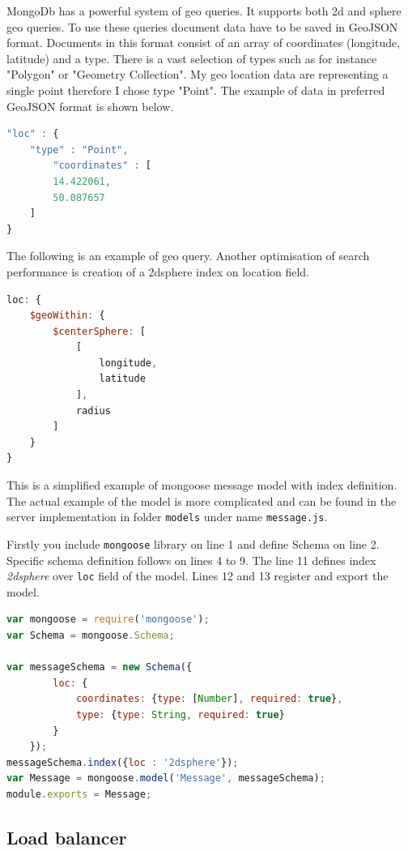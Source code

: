 \documentclass[thesis=M,english]{FITthesis}[2012/10/20]
\begin{document}
MongoDb has a powerful system of geo queries. It supports both 2d and sphere geo queries. To use these queries document data have to be saved in GeoJSON format. Documents in this format consist of an array of coordinates (longitude, latitude) and a type. There is a vast selection of types such as for instance "Polygon" or "Geometry Collection". My geo location data are representing a single point therefore I chose type "Point". The example of data in preferred GeoJSON format is shown below.

\begin{lstlisting}[language=JavaScript]
"loc" : {
    "type" : "Point",
        "coordinates" : [
        14.422061,
        50.087657
    ]
}
\end{lstlisting}

The following is an example of geo query. Another optimisation of search performance is creation of a 2dsphere index on location field.

\begin{lstlisting}[language=JavaScript]
loc: {
    $geoWithin: {
        $centerSphere: [
            [
                longitude,
                latitude
            ],
            radius
        ]
    }
}
\end{lstlisting}

This is a simplified example of mongoose message model with index definition. The actual example of the model is more complicated and can be found in the server implementation in folder \verb|models| under name \verb|message.js|.

Firstly you include \verb|mongoose| library on line 1 and define Schema on line 2. Specific schema definition follows on lines 4 to 9. The line 11 defines index \textit{2dsphere} over \verb|loc| field of the model. Lines 12 and 13 register and export the model.
 
\begin{lstlisting}[language=JavaScript]
var mongoose = require('mongoose');
var Schema = mongoose.Schema;

var messageSchema = new Schema({
        loc: {
            coordinates: {type: [Number], required: true},
            type: {type: String, required: true}
        }
    });
messageSchema.index({loc : '2dsphere'});
var Message = mongoose.model('Message', messageSchema);
module.exports = Message;
\end{lstlisting}


\subsection{Load balancer}
\end{document}
